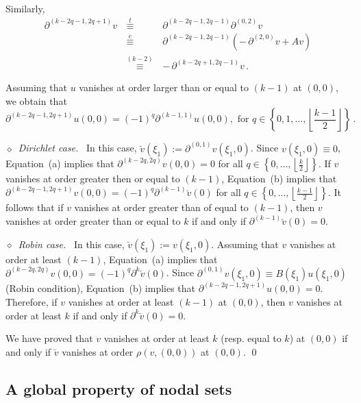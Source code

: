 \documentclass[12pt,a4paper]{amsart}
\theoremstyle{plain} %
\theoremstyle{definition}
\numberwithin{equation}{section}
\numberwithin{figure}{section}
\numberwithin{table}{section}
\newcommand{\set}[1]{\left\lbrace #1 \right\rbrace}
\newcommand{\noid}{\noindent $\diamond$~}
\newcommand{\floor}[1]{\left\lfloor #1 \right\rfloor}
\newcommand{\equivo}[1]{\, \overset{#1}{\equiv}\,}
\begin{document}
Similarly,
%
\begin{equation*}
\begin{array}{lcl}
\partial^{(k-2q-1,2q+1)}v & \equivo{t} & \partial^{(k-2q-1,2q-1)} \partial^{(0,2)} v\\[5pt]
& \equivo{e} & \partial^{(k-2q-1,2q-1)} \left( -\, \partial^{(2,0)}v + A v\right)\\[5pt]
& \equivo{(k-2)} & -\, \partial^{(k-2q+1,2q-1)}v\,.
\end{array}%
\end{equation*}

Assuming that $u$ vanishes at order larger than or equal to $(k-1)$ at $(0,0)$, we obtain that
%
\begin{equation*}
\partial^{(k-2q-1,2q+1)}u(0,0) = (-1)^q \partial^{(k-1,1)}u(0,0), \text{~for~} q \in \set{0,1,\ldots,\floor{\frac{k-1}{2}}}\,. \tag{b}
\end{equation*}


\noid \emph{Dirichlet case.}~ In this case, $\breve{v}(\xi_1) := \partial^{(0,1)}v(\xi_1,0)$. Since $v(\xi_1,0) \equiv 0$, Equation~(a) implies that
$\partial^{(k-2q,2q)}v(0,0) = 0$ for all $q \in \set{0,\ldots,\floor{\frac k2}}$. If $v$ vanishes at order greater then or equal to $(k-1)$, Equation~(b) implies that
$\partial^{(k-2q-1,2q+1)}v(0,0) = (-1)^q \partial^{(k-1)}\breve{v}(0)$ for all $q \in \set{0,\ldots,\floor{\frac{k-1}{2}}}$. It follows that if $v$ vanishes at order greater than of equal to $(k-1)$, then $v$ vanishes at order greater than or equal to $k$ if and only if $\partial^{(k-1)}\breve{v}(0) = 0$.\medskip

\noid \emph{Robin case.}~ In this case, $\breve{v}(\xi_1) := v(\xi_1,0)$. Assuming that $v$ vanishes at order at least $(k-1)$, Equation~(a) implies that
$\partial^{(k-2q,2q)}v(0,0) = (-1)^q \partial^{k}\breve{v}(0)$. Since $\partial^{(0,1)}v(\xi_1,0) \equiv B(\xi_1) u(\xi_1,0)$ (Robin condition), Equation~(b) implies that $\partial^{(k-2q-1,2q+1)}u(0,0) = 0$. Therefore, if $v$ vanishes at order at least $(k-1)$ at $(0,0)$, then $v$ vanishes at order at least $k$ if and only if $\partial^{k}\breve{v}(0)=0$.\medskip

We have proved that $v$ vanishes at order at least $k$ (resp. equal to $k$) at $(0,0)$ if and only if $\breve{v}$ vanishes at order $\rho(v,(0,0))$ at $(0,0)$. \hfill\qed



\subsection{A global property of nodal sets}\label{SS-gpns}
\end{document}
